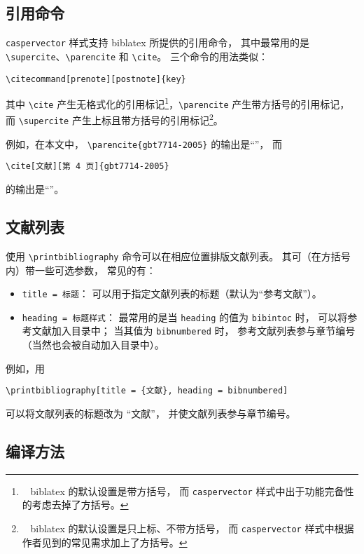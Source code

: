 \documentclass[UTF8, fancyhdr, hyperref]{ctexart}
\begin{document}
\subsection{引用命令}

\verb|caspervector| 样式支持 biblatex 所提供的引用命令，
其中最常用的是 \verb|\supercite|、\verb|\parencite| 和 \verb|\cite|。
三个命令的用法类似：
\begin{Verbatim}[frame = single]
% 可选参数 prenote 和 postnote 分别用于设定引用记号前、后的注释。
\citecommand[prenote][postnote]{key}
\end{Verbatim}
其中 \verb|\cite| 产生无格式化的引用标记\footnote{\ %
	biblatex 的默认设置是带方括号，
	而 \texttt{caspervector} 样式中出于功能完备性的考虑去掉了方括号。%
}，\verb|\parencite| 产生带方括号的引用标记，
而 \verb|\supercite| 产生上标且带方括号的引用标记\footnote{\ %
	biblatex 的默认设置是只上标、不带方括号，
	而 \texttt{caspervector} 样式中根据作者见到的常见需求加上了方括号。%
}。

例如，在本文中，%
\verb|\parencite{gbt7714-2005}| 的输出是“\parencite{gbt7714-2005}”，
而
\begin{Verbatim}[frame = single]
\cite[文献][第 4 页]{gbt7714-2005}
\end{Verbatim}
的输出是“\cite[文献][第 4 页]{gbt7714-2005}”。

\subsection{文献列表}

使用 \verb|\printbibliography| 命令可以在相应位置排版文献列表。
其可（在方括号内）带一些可选参数\supercite{biblatex}，
常见的有：
\begin{itemize}
	\item \verb|title = 标题|：
		可以用于指定文献列表的标题（默认为“参考文献”）。
	\item \verb|heading = 标题样式|：
		最常用的是当 \verb|heading| 的值为 \verb|bibintoc| 时，
		可以将参考文献加入目录中；
		当其值为 \verb|bibnumbered| 时，
		参考文献列表参与章节编号（当然也会被自动加入目录中）。
\end{itemize}

例如，用
\begin{Verbatim}[frame = single]
\printbibliography[title = {文献}, heading = bibnumbered]
\end{Verbatim}
可以将文献列表的标题改为 “文献”，
并使文献列表参与章节编号。

\subsection{编译方法}
\end{document}
